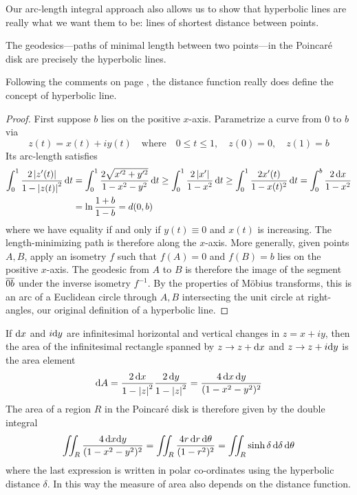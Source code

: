 \goodbreak
	
Our arc-length integral approach also allows us to show that hyperbolic lines are really what we want them to be: lines of shortest distance between points.
	
\begin{thm}{}{}
	The geodesics---paths of minimal length between two points---in the Poincaré disk are precisely the hyperbolic lines.
\end{thm}

Following the comments on page \pageref{sec:hyperiso}, the distance function really does define the concept of hyperbolic line.

\begin{proof}
	First suppose $b$ lies on the positive $x$-axis. Parametrize a curve from $0$ to $b$ via
	\[
		z(t)=x(t)+iy(t)\quad\text{where}\quad 0\le t\le 1,\quad z(0)=0,\quad z(1)=b
	\]
	Its arc-length satisfies
	\begin{align*}
		\int_{0}^{1}\frac{2\left| z'(t)\right|}{1-\left| z(t)\right|^2}\,{\mathrm{d} t}
		&=\int_{0}^{1}\frac{2\sqrt{x'^2+y'^2}}{1-x^2-y^2}\,{\mathrm{d} t}\ge \int_{0}^{1}\frac{2\left| x'\right|}{1-x^2}\,{\mathrm{d} t}\ge \int_{0}^{1}\frac{2x'(t)}{1-x(t)^2}\,{\mathrm{d} t} =\int_0^b\frac{2\,{\mathrm{d} x}}{1-x^2}\\
		&=\ln\frac{1+b}{1-b}=d(0,b)
	\end{align*}
	where we have equality if and only if $y(t)\equiv 0$ and $x(t)$ is increasing. The length-minimizing path is therefore along the $x$-axis.\smallbreak
	More generally, given points $A,B$, apply an isometry $f$ such that $f(A)=0$ and $f(B)=b$ lies on the positive $x$-axis. The geodesic from $A$ to $B$ is therefore the image of the segment $\overline{0b}$ under the inverse isometry $f^{-1}$. By the properties of Möbius transforms, this is an arc of a Euclidean circle through $A,B$ intersecting the unit circle at right-angles, our original definition of a hyperbolic line.
\end{proof}


If ${\mathrm{d} x}$ and $i{\mathrm{d} y}$ are infinitesimal horizontal and vertical changes in $z=x+iy$, then the area of the infinitesimal rectangle spanned by $z\to z+{\mathrm{d} x}$ and $z\to z+i{\mathrm{d} y}$ is the area element
\[
	{\mathrm{d} A}=\frac{2\,{\mathrm{d} x}}{1-\left| z\right|^2}\frac{2\,{\mathrm{d} y}}{1-\left| z\right|^2} =\frac{4\,{\mathrm{d} x}\,{\mathrm{d} y}}{(1-x^2-y^2)^2}
\]
The area of a region $R$ in the Poincaré disk is therefore given by the double integral
\[
	\iint_R\frac{4\,{\mathrm{d} x}{\mathrm{d} y}}{(1-x^2-y^2)^2}=\iint_R\frac{4r\,{\mathrm{d} r}\,{\mathrm{d}\theta}}{(1-r^2)^2} =\iint_R\sinh\delta\,\mathrm{d}\delta\,{\mathrm{d}\theta}
\]
where the last expression is written in polar co-ordinates using the hyperbolic distance $\delta$. In this way the measure of area also depends on the distance function.
	
